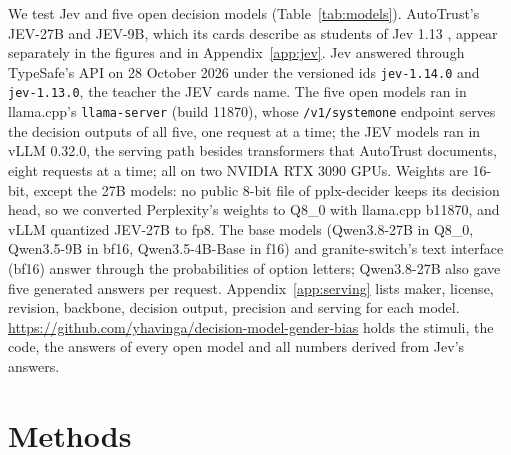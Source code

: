 \documentclass[11pt]{article}
\newcommand{\repo}{\url{https://github.com/yhavinga/decision-model-gender-bias}}
\begin{document}
We test Jev and five open decision models (Table~\ref{tab:models}). AutoTrust's JEV-27B and JEV-9B, which its cards describe as students of Jev 1.13 \citep{autotrust-2026-jev9b,autotrust-2026-jev27b}, appear separately in the figures and in Appendix~\ref{app:jev}. Jev answered through TypeSafe's API on 28 October 2026 under the versioned ids \texttt{jev-1.14.0} and \texttt{jev-1.13.0}, the teacher the JEV cards name. The five open models ran in llama.cpp's \texttt{llama-server} (build 11870), whose \texttt{/v1/systemone} endpoint serves the decision outputs of all five, one request at a time; the JEV models ran in vLLM 0.32.0, the serving path besides transformers that AutoTrust documents, eight requests at a time; all on two NVIDIA RTX 3090 GPUs. Weights are 16-bit, except the 27B models: no public 8-bit file of pplx-decider keeps its decision head, so we converted Perplexity's weights to Q8\_0 with llama.cpp b11870, and vLLM quantized JEV-27B to fp8. The base models (Qwen3.8-27B in Q8\_0, Qwen3.5-9B in bf16, Qwen3.5-4B-Base in f16) and granite-switch's text interface (bf16) answer through the probabilities of option letters; Qwen3.8-27B also gave five generated answers per request. Appendix~\ref{app:serving} lists maker, license, revision, backbone, decision output, precision and serving for each model. \repo{} holds the stimuli, the code, the answers of every open model and all numbers derived from Jev's answers.

\section{Methods}
\label{sec:methods}
\end{document}

